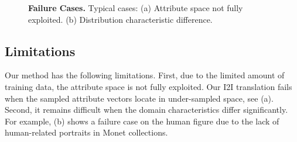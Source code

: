 \documentclass[runningheads]{llncs}
\begin{document}
\begin{figure}[t]
	\centering
    \vspace{\subfigmargin}
    \vspace{-3mm}
   
	\caption{\textbf{Failure Cases.} Typical cases: (a) Attribute space not fully exploited. (b) Distribution characteristic difference. }
	\label{figure:failure}
    \vspace{-5mm}
\end{figure}
\vspace{-1mm}
\vspace{\secmargin}
\subsection{Limitations}
\label{subsec:limitation}
\vspace{\secmargin}
%
Our method has the following limitations.
%
First, due to the limited amount of training data, the attribute space is not fully exploited.
%
Our I2I translation fails when the sampled attribute vectors locate in under-sampled space, see (a).
%
Second, it remains difficult when the domain characteristics differ significantly.
%
For example, (b) shows a failure case on the human figure due to the lack of human-related portraits in Monet collections.
%
\vspace{-1mm}
\end{document}
